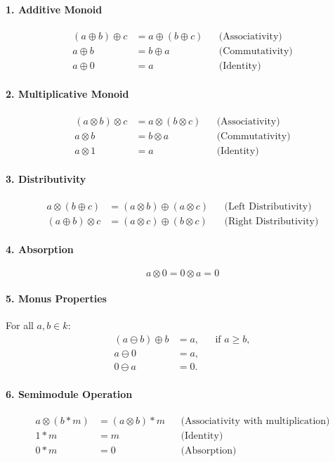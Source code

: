 \begin{toappendix}
\paragraph{1. Additive Monoid}
\[
\begin{aligned}
(a \oplus b) \oplus c &= a \oplus (b \oplus c) && \text{(Associativity)} \\
a \oplus b &= b \oplus a && \text{(Commutativity)} \\
a \oplus 0 &= a && \text{(Identity)}
\end{aligned}
\]

\paragraph{2. Multiplicative Monoid}
\[
\begin{aligned}
(a \otimes b) \otimes c &= a \otimes (b \otimes c) && \text{(Associativity)} \\
a \otimes b &= b \otimes a && \text{(Commutativity)} \\
a \otimes 1 &= a && \text{(Identity)}
\end{aligned}
\]

\paragraph{3. Distributivity}
\[
\begin{aligned}
a \otimes (b \oplus c) &= (a \otimes b) \oplus (a \otimes c) && \text{(Left Distributivity)} \\
(a \oplus b) \otimes c &= (a \otimes c) \oplus (b \otimes c) && \text{(Right Distributivity)}
\end{aligned}
\]

\paragraph{4. Absorption}
\[
a \otimes 0 = 0 \otimes a = 0
\]

\paragraph{5. Monus Properties}
For all \( a, b \in k \):
\[
\begin{aligned}
(a \ominus b) \oplus b &= a, && \text{if } a \ge b, \\
a \ominus 0 &= a, \\
0 \ominus a &= 0.
\end{aligned}
\]

\paragraph{6. Semimodule Operation}
\[
\begin{aligned}
a \otimes (b * m) &= (a \otimes b) * m && \text{(Associativity with multiplication)} \\
1 * m &= m && \text{(Identity)} \\
0 * m &= 0 && \text{(Absorption)}
\end{aligned}
\]


\end{toappendix}
